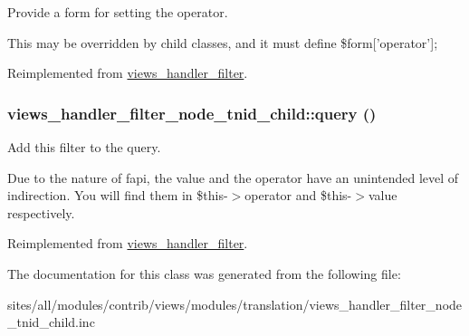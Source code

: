 Provide a form for setting the operator.

This may be overridden by child classes, and it must define \$form\mbox{[}'operator'\mbox{]}; 

Reimplemented from \hyperlink{classviews__handler__filter_8c77c0a8bba8c3ceceae8950fc7b1121}{views\_\-handler\_\-filter}.\hypertarget{classviews__handler__filter__node__tnid__child_a21b64d11f0f79a113be65b65e6249e0}{
\subsubsection[{query}]{\setlength{\rightskip}{0pt plus 5cm}views\_\-handler\_\-filter\_\-node\_\-tnid\_\-child::query ()}}
\label{classviews__handler__filter__node__tnid__child_a21b64d11f0f79a113be65b65e6249e0}


Add this filter to the query.

Due to the nature of fapi, the value and the operator have an unintended level of indirection. You will find them in \$this-$>$operator and \$this-$>$value respectively. 

Reimplemented from \hyperlink{classviews__handler__filter_8e513b3abbc2559f37b550ca4957b4ae}{views\_\-handler\_\-filter}.

The documentation for this class was generated from the following file:\begin{CompactItemize}
\item 
sites/all/modules/contrib/views/modules/translation/views\_\-handler\_\-filter\_\-node\_\-tnid\_\-child.inc\end{CompactItemize}
